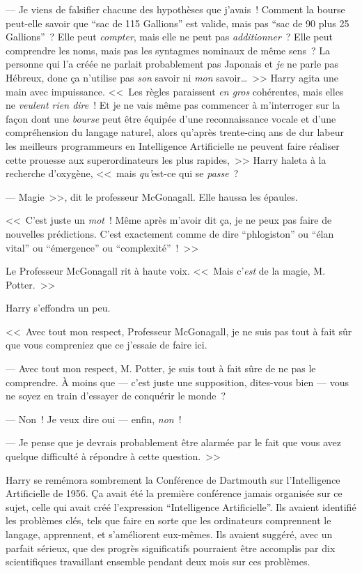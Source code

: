 --- Je viens de falsifier chacune des hypothèses que j'avais~! Comment la bourse peut-elle savoir que “sac de 115 Gallions” est valide, mais pas “sac de 90 plus 25 Gallions”~? Elle peut \emph{compter}, mais elle ne peut pas \emph{additionner}~? Elle peut comprendre les noms, mais pas les syntagmes nominaux de même sens~? La personne qui l'a créée ne parlait probablement pas Japonais et \emph{je} ne parle pas Hébreux, donc ça n'utilise pas \emph{son} savoir ni \emph{mon} savoir…~>> Harry agita une main avec impuissance. <<~Les règles paraissent \emph{en gros} cohérentes, mais elles ne \emph{veulent rien dire}~! Et je ne vais même pas commencer à m'interroger sur la façon dont une \emph{bourse} peut être équipée d'une reconnaissance vocale et d'une compréhension du langage naturel, alors qu'après trente-cinq ans de dur labeur les meilleurs programmeurs en Intelligence Artificielle ne peuvent faire réaliser cette prouesse aux superordinateurs les plus rapides,~>> Harry haleta à la recherche d'oxygène, <<~mais \emph{qu'}est-ce qui se \emph{passe}~?

--- Magie~>>, dit le professeur McGonagall. Elle haussa les épaules.

<<~C'est juste un \emph{mot}~! Même après m'avoir dit ça, je ne peux pas faire de nouvelles prédictions. C'est exactement comme de dire “phlogiston” ou “élan vital” ou “émergence” ou “complexité”~!~>>

Le Professeur McGonagall rit à haute voix. <<~Mais c'\emph{est} de la magie, M. Potter.~>>

Harry s'effondra un peu.

<<~Avec tout mon respect, Professeur McGonagall, je ne suis pas tout à fait sûr que vous compreniez que ce j'essaie de faire ici.

--- Avec tout mon respect, M. Potter, je suis tout à fait sûre de ne pas le comprendre. À moins que — c'est juste une supposition, dites-vous bien — vous ne soyez en train d'essayer de conquérir le monde~?

--- Non~! Je veux dire oui — enfin, \emph{non}~!

--- Je pense que je devrais probablement être alarmée par le fait que vous avez quelque difficulté à répondre à cette question.~>>

Harry se remémora sombrement la Conférence de Dartmouth sur l'Intelligence Artificielle de 1956. Ça avait été la première conférence jamais organisée sur ce sujet, celle qui avait créé l'expression “Intelligence Artificielle”. Ils avaient identifié les problèmes clés, tels que faire en sorte que les ordinateurs comprennent le langage, apprennent, et s'améliorent eux-mêmes. Ils avaient suggéré, avec un parfait sérieux, que des progrès significatifs pourraient être accomplis par dix scientifiques travaillant ensemble pendant deux mois sur ces problèmes.

